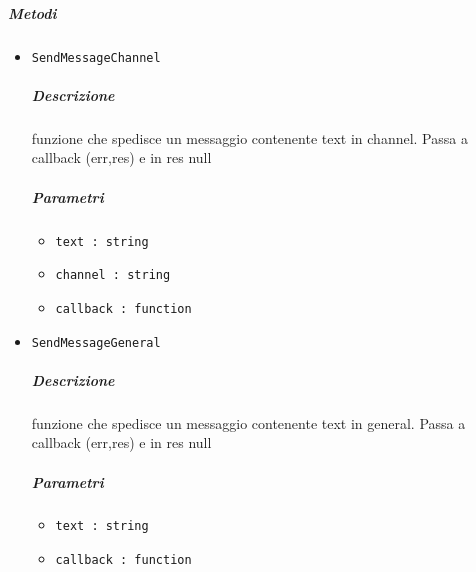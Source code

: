 \documentclass[../ManualeSviluppatore_v1.0.0.tex]{subfiles}
\begin{document}
\subparagraph{Metodi}\begin{itemize}
\item \texttt{SendMessageChannel}
\subparagraph{Descrizione} funzione che spedisce un messaggio contenente text in channel. Passa a callback (err,res) e in res null
\subparagraph{Parametri} \begin{itemize}
\item \texttt{text : string}
\item \texttt{channel : string}
\item \texttt{callback : function}
\end{itemize}
\item \texttt{SendMessageGeneral}
\subparagraph{Descrizione} funzione che spedisce un messaggio contenente text in general. Passa a callback (err,res) e in res null
\subparagraph{Parametri} \begin{itemize}
\item \texttt{text : string}
\item \texttt{callback : function}
\end{itemize}
\end{itemize}
\end{document}
